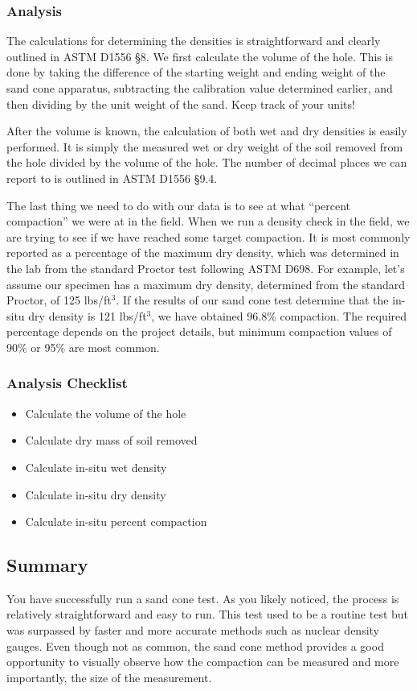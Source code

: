 \documentclass[12pt]{article}
\begin{document}
\subsubsection{Analysis}
The calculations for determining the densities is straightforward and clearly outlined in ASTM D1556 \S8. We first calculate the volume of the hole. This is done by taking the difference of the starting weight and ending weight of the sand cone apparatus, subtracting the calibration value determined earlier, and then dividing by the unit weight of the sand. Keep track of your units!

After the volume is known, the calculation of both wet and dry densities is easily performed. It is simply the measured wet or dry weight of the soil removed from the hole divided by the volume of the hole. The number of decimal places we can report to is outlined in ASTM D1556 \S9.4.

The last thing we need to do with our data is to see at what ``percent compaction'' we were at in the field. When we run a density check in the field, we are trying to see if we have reached some target compaction. It is most commonly reported as a percentage of the maximum dry density, which was determined in the lab from the standard Proctor test following ASTM D698. For example, let's assume our specimen has a maximum dry density, determined from the standard Proctor, of 125 lbs/ft$^3$. If the results of our sand cone test determine that the in-situ dry density is 121 lbs/ft$^3$, we have obtained 96.8\% compaction. The required percentage depends on the project details, but minimum compaction values of 90\% or 95\% are most common.

\subsubsection*{Analysis Checklist}
\begin{itemize}
    \item Calculate the volume of the hole
    \item Calculate dry mass of soil removed
    \item Calculate in-situ wet density
    \item Calculate in-situ dry density
    \item Calculate in-situ percent compaction
\end{itemize}

\subsection{Summary}
You have successfully run a sand cone test. As you likely noticed, the process is relatively straightforward and easy to run. This test used to be a routine test but was surpassed by faster and more accurate methods such as nuclear density gauges. Even though not as common, the sand cone method provides a good opportunity to visually observe how the compaction can be measured and more importantly, the size of the measurement.
\end{document}
